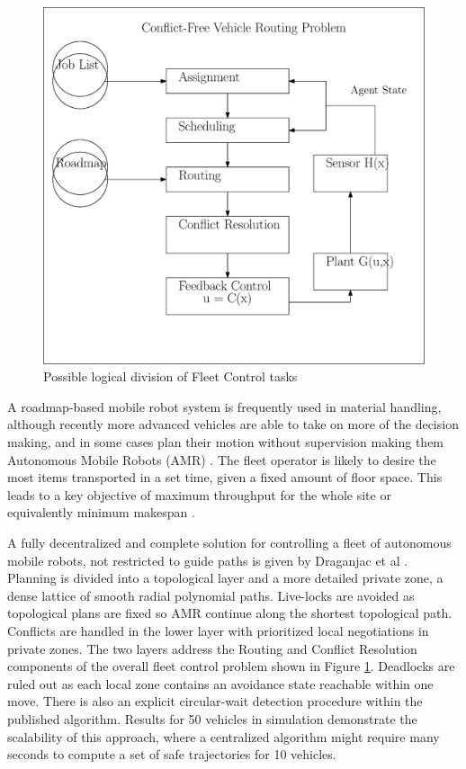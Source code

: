 \documentclass[runningheads]{llncs}
\begin{document}
\begin{figure}[htbp]
\centerline{\includegraphics[width=0.7\linewidth]{dcfvrp_logical_blocks.eps}}
\caption{Possible logical division of Fleet Control tasks}
\label{fig:logical_blocks}
\end{figure}
A roadmap-based mobile robot system is frequently used in material handling, although recently more advanced vehicles are able to take on more of the decision making, and in some cases plan their motion without supervision making them Autonomous Mobile Robots (AMR) \cite{Fragapane2021}. The fleet operator is likely to desire the most items transported in a set time, given a fixed amount of floor space. This leads to a key objective of maximum throughput for the whole site or equivalently minimum makespan \cite{Lamballais2017}.    

A fully decentralized and complete solution for controlling a fleet of autonomous mobile robots, not restricted to guide paths is given by Draganjac et al \cite{Draganjac2020}. Planning is divided into a topological layer and a more detailed private zone, a dense lattice of smooth radial polynomial paths. Live-locks are avoided as topological plans are fixed so AMR continue along the shortest topological path. Conflicts are handled in the lower layer with prioritized local negotiations in private zones. The two layers address the Routing and Conflict Resolution components of the overall fleet control problem shown in Figure \ref{fig:logical_blocks}. Deadlocks are ruled out as each local zone contains an avoidance state reachable within one move. There is also an explicit circular-wait detection procedure within the published algorithm. Results for 50 vehicles in simulation demonstrate the scalability of this approach, where a centralized algorithm might require many seconds to compute a set of safe trajectories for 10 vehicles. 
\end{document}
